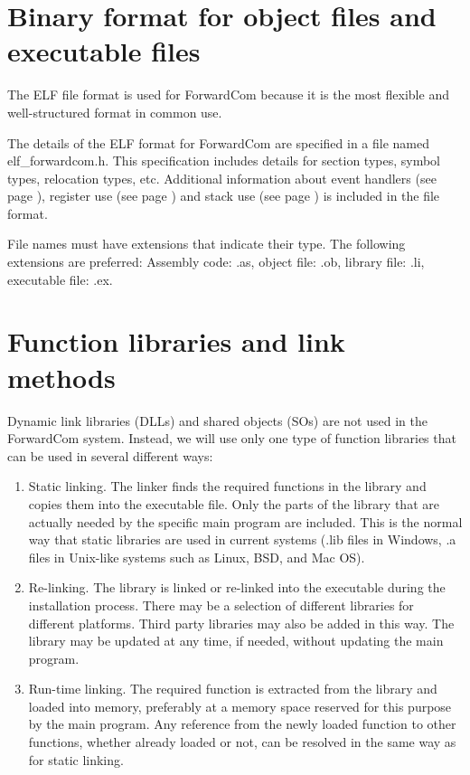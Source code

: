 \documentclass[forwardcom.tex]{subfiles}
\begin{document}
\RaggedRight

\section{Binary format for object files and executable files} \label{objectFileFormat}
The ELF file format is used for ForwardCom because it is the most flexible and well-structured format in common use.
\vspace{2mm}

The details of the ELF format for ForwardCom are specified in a file named elf\_forwardcom.h. This specification includes details for section types, symbol types, relocation types, etc. Additional information about event handlers (see page \pageref{EventHandlers}), register use (see page \pageref{chap:registerUsageConvention}) and stack use (see page \pageref{predictingStackSize}) is included in the file format. 
\vspace{2mm}

File names must have extensions that indicate their type. The following extensions are preferred:  Assembly code: .as, object file: .ob, library file: .li, executable file: .ex. 
\vspace{2mm}

\section{Function libraries and link methods} \label{libraryLinkMethods}
Dynamic link libraries (DLLs) and shared objects (SOs) are not used in the ForwardCom system. Instead, we will use only one type of function libraries that can be used in several different ways: 

\begin{enumerate}
\item Static linking. \label{staticLinking} The linker finds the required functions in the library and copies them into the executable file. Only the parts of the library that are actually needed by the specific main program are included. This is the normal way that static libraries are used in current systems (.lib files in Windows, .a files in Unix-like systems such as Linux, BSD, and Mac OS). 

\item  Re-linking. \label{InstallationReLinking} The library is linked or re-linked into the executable during the installation process. There may be a selection of different libraries for different platforms. Third party libraries may also be added in this way.
The library may be updated at any time, if needed, without updating the main program.

\item  Run-time linking. \label{runtimeLinking} The required function is extracted from the library and loaded into memory, preferably at a memory space reserved for this purpose by the main program. Any reference from the newly loaded function to other functions, whether already loaded or not, can be resolved in the same way as for static linking. 
\end{enumerate}
\end{document}
